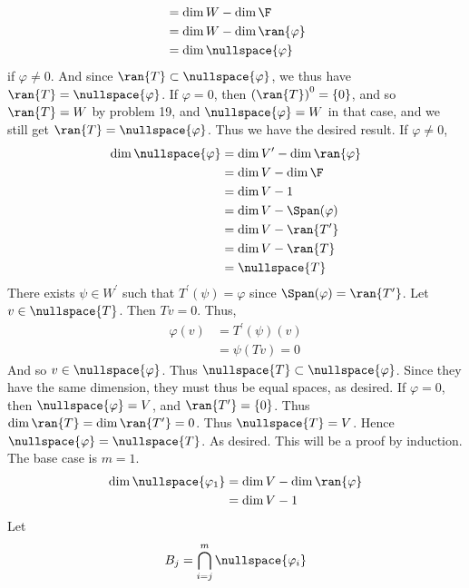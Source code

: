 \documentclass{book}
\begin{document}
\begin{enumerate}[label=\arabic*)]
\begin{align*}
        & = \dim{W} - \dim{\F} \\
        & = \dim{W} - \dim{\ran{\varphi}} \\
        & = \dim{\nullspace{\varphi}}
      \end{align*}
      if $\varphi \neq 0$. And since $\ran{T} \subset \nullspace{\varphi}$, we thus have $\ran{T} = \nullspace{\varphi}$. If $\varphi = 0$, then $\left( \ran{T} \right)^0 = \{0\}$, and so
      $\ran{T} = W$ by problem 19, and $\nullspace{\varphi} = W$ in that case, and we still get $\ran{T} = \nullspace{\varphi}$. Thus we have the desired result.
    \ii
      If $\varphi \neq 0$,
      \begin{align*}
        \dim{\nullspace{\varphi}} & = \dim{V^{\prime}} - \dim{\ran{\varphi}} \\
        & = \dim{V} - \dim{\F} \\
        & = \dim{V} - 1 \\
        & = \dim{V} - \Span(\varphi) \\
        & = \dim{V} - \ran{T^{\prime}} \\
        & = \dim{V} - \ran{T} \\
        & = \nullspace{T}
      \end{align*}
      There exists $\psi \in W^{\prime}$ such that $T^{\prime}(\psi) = \varphi$ since $\Span(\varphi) = \ran{T^{\prime}}$. Let $v \in \nullspace{T}$. Then $Tv = 0$. Thus,
      \begin{align*}
        \varphi(v) & = T^{\prime}(\psi)(v) \\
        & = \psi(Tv) = 0
      \end{align*}
      And so $v \in \nullspace{\varphi}$. Thus $\nullspace{T} \subset \nullspace{\varphi}$. Since they have the same dimension, they must thus be equal spaces, as desired. If $\varphi = 0$, then
      $\nullspace{\varphi} = V$, and $\ran{T^{\prime}} = \{0\}$. Thus $\dim{\ran{T}} = \dim{\ran{T^{\prime}}} = 0$. Thus $\nullspace{T} = V$. Hence $\nullspace{\varphi} =
      \nullspace{T}$. As desired.
    \ii
      This will be a proof by induction. The base case is $m = 1$. 
      \begin{align*}
        \dim{\nullspace{\varphi_1}} & = \dim{V} - \dim{\ran{\varphi}} \\
        & = \dim{V} - 1
      \end{align*}
      Let 
      \begin{align*}
        B_j = \bigcap_{i = j}^{m}\nullspace{\varphi_i} 
      \end{align*}

\end{enumerate}
\end{document}
